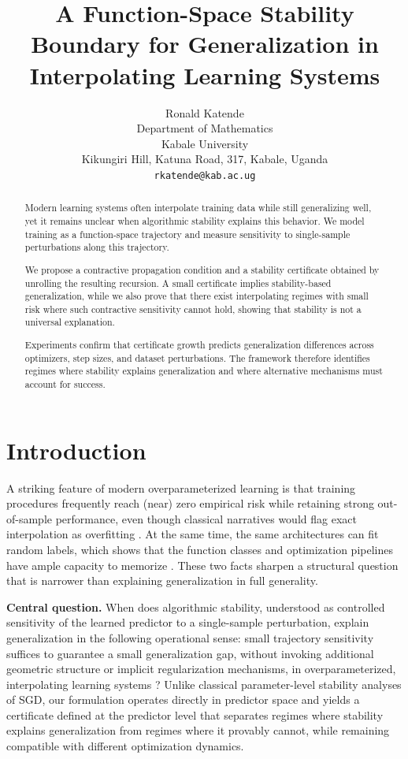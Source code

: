 \documentclass{article}
\title{A Function-Space Stability Boundary for Generalization in Interpolating Learning Systems}
\author{Ronald Katende \\
Department of Mathematics\\
Kabale University\\
Kikungiri Hill, Katuna Road, 317, Kabale, Uganda\\
\texttt{rkatende@kab.ac.ug} %
}
\date{}
\numberwithin{equation}{section}
\begin{document}
\maketitle

\begin{abstract}
Modern learning systems often interpolate training data while still generalizing well, yet it remains unclear when algorithmic stability explains this behavior. We model training as a function-space trajectory and measure sensitivity to single-sample perturbations along this trajectory.

We propose a contractive propagation condition and a stability certificate obtained by unrolling the resulting recursion. A small certificate implies stability-based generalization, while we also prove that there exist interpolating regimes with small risk where such contractive sensitivity cannot hold, showing that stability is not a universal explanation.

Experiments confirm that certificate growth predicts generalization differences across optimizers, step sizes, and dataset perturbations. The framework therefore identifies regimes where stability explains generalization and where alternative mechanisms must account for success.
\end{abstract}



\section{Introduction}

\label{sec:intro}

A striking feature of modern overparameterized learning is that training procedures frequently reach (near) zero empirical risk while retaining strong out-of-sample performance, even though classical narratives would flag exact interpolation as overfitting \cite{belkin2019double}.
At the same time, the same architectures can fit random labels, which shows that the function classes and optimization pipelines have ample capacity to memorize \cite{DBLP:conf/iclr/ZhangBHRV17}.
These two facts sharpen a structural question that is narrower than explaining generalization in full generality. 

\smallskip
\noindent\textbf{Central question.}
When does algorithmic stability, understood as controlled sensitivity of the learned predictor to a single-sample perturbation, explain generalization in the following operational sense: small trajectory sensitivity suffices to guarantee a small generalization gap, without invoking additional geometric structure or implicit regularization mechanisms, in overparameterized, interpolating learning systems \cite{bousquet2002stability}? Unlike classical parameter-level stability analyses of SGD, our formulation operates directly in predictor space and yields a certificate defined at the predictor level that separates regimes where stability explains generalization from regimes where it provably cannot, while remaining compatible with different optimization dynamics.
\end{document}
